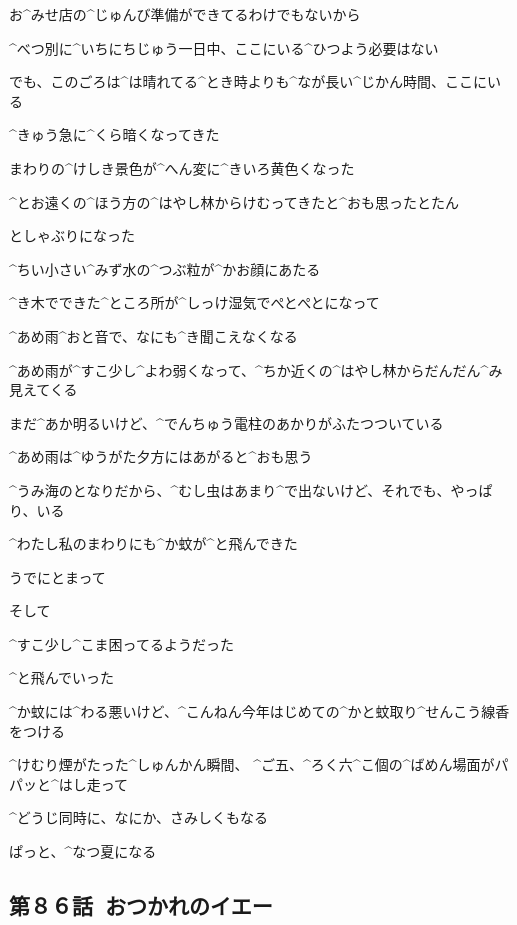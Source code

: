 \A お^{みせ}{店}の^{じゅんび}{準備}ができてるわけでもないから

\A ^{べつ}{別}に^{いちにちじゅう}{一日中}、ここにいる^{ひつよう}{必要}はない

\A でも、このごろは^{は}{晴}れてる^{とき}{時}よりも^{なが}{長}い^{じかん}{時間}、ここにいる

\page
\A ^{きゅう}{急}に^{くら}{暗}くなってきた

\A まわりの^{けしき}{景色}が^{へん}{変}に^{きいろ}{黄色}くなった

\page
\A ^{とお}{遠}くの^{ほう}{方}の^{はやし}{林}からけむってきたと^{おも}{思}ったとたん

\A としゃぶりになった

\A ^{ちい}{小}さい^{みず}{水}の^{つぶ}{粒}が^{かお}{顔}にあたる

\page
\A ^{き}{木}でできた^{ところ}{所}が^{しっけ}{湿気}でぺとぺとになって

\A ^{あめ}{雨}^{おと}{音}で、なにも^{き}{聞}こえなくなる

\page[123]
\A ^{あめ}{雨}が^{すこ}{少}し^{よわ}{弱}くなって、^{ちか}{近}くの^{はやし}{林}からだんだん^{み}{見}えてくる

\A まだ^{あか}{明}るいけど、^{でんちゅう}{電柱}のあかりがふたつついている

\A ^{あめ}{雨}は^{ゆうがた}{夕方}にはあがると^{おも}{思}う

\page
\A ^{うみ}{海}のとなりだから、^{むし}{虫}はあまり^{で}{出}ないけど、それでも、やっぱり、いる

\page
\A ^{わたし}{私}のまわりにも^{か}{蚊}が^{と}{飛}んできた

\A うでにとまって

\A そして

\A ^{すこ}{少}し^{こま}{困}ってるようだった

\A ^{と}{飛}んでいった

\page
\A ^{か}{蚊}には^{わる}{悪}いけど、^{こんねん}{今年}はじめての^{かと}{蚊取}り^{せんこう}{線香}をつける

\page
\A ^{けむり}{煙}がたった^{しゅんかん}{瞬間}、
^{ご}{五}、^{ろく}{六}^{こ}{個}の^{ばめん}{場面}がパパッと^{はし}{走}って

\A ^{どうじ}{同時}に、なにか、さみしくもなる

\page
\A ぱっと、^{なつ}{夏}になる


\subsection{第８６話\ おつかれのイエー}

